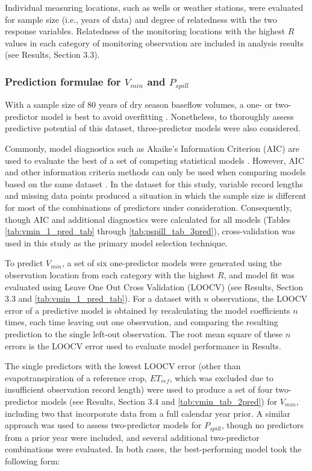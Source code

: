 \documentclass[hess, manuscript]{copernicus}
\begin{document}
Individual measuring locations, such as wells or weather stations, were
evaluated for sample size (i.e., years of data) and degree of
relatedness with the two response variables. Relatedness of the
monitoring locations with the highest \(R\) values in each category of
monitoring observation are included in analysis results (see Results,
Section 3.3).

\subsubsection{\texorpdfstring{Prediction formulae for \(V_{min}\) and
\(P_{spill}\)}{Prediction formulae for V\_\{min\} and P\_\{spill\}}}

With a sample size of 80 years of dry season baseflow volumes, a one- or
two-predictor model is best to avoid overfitting \citep{James2013}.
Nonetheless, to thoroughly assess predictive potential of this dataset,
three-predictor models were also considered.

Commonly, model diagnostics such as Akaike's Information Criterion (AIC)
are used to evaluate the best of a set of competing statistical models
\citep{Burnham2004}. However, AIC and other information criteria methods
can only be used when comparing models based on the same dataset
\citep{Burnham2004}. In the dataset for this study, variable record
lengths and missing data points produced a situation in which the sample
size is different for most of the combinations of predictors under
consideration. Consequently, though AIC and additional diagnostics were
calculated for all models (Tables \ref{tab:vmin_1_pred_tab} through
\ref{tab:pspill_tab_3pred}), cross-validation was used in this study as
the primary model selection technique.

To predict \(V_{min}\), a set of six one-predictor models were generated
using the observation location from each category with the highest
\(R\), and model fit was evaluated using Leave One Out Cross Validation
(LOOCV) \citep{James2013} (see Results, Section 3.3 and
\autoref{tab:vmin_1_pred_tab}). For a dataset with \(n\) observations,
the LOOCV error of a predictive model is obtained by recalculating the
model coefficients \(n\) times, each time leaving out one observation,
and comparing the resulting prediction to the single left-out
observation. The root mean square of these \(n\) errors is the LOOCV
error used to evaluate model performance in Results.

The single predictors with the lowest LOOCV error (other than
evapotranspiration of a reference crop, \(ET_{ref}\), which was excluded
due to insufficient observation record length) were used to produce a
set of four two-predictor models (see Results, Section 3.4 and
\autoref{tab:vmin_tab_2pred}) for \(V_{min}\), including two that
incorporate data from a full calendar year prior. A similar approach was
used to assess two-predictor models for \(P_{spill}\), though no
predictors from a prior year were included, and several additional
two-predictor combinations were evaluated. In both cases, the
best-performing model took the following form:
\end{document}
